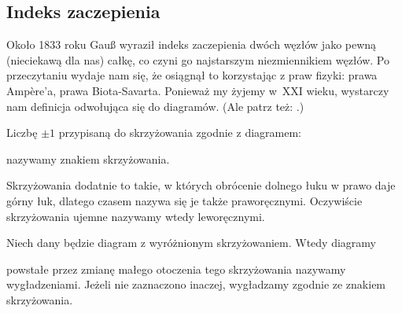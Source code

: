
\subsection{Indeks zaczepienia}
%
Około 1833 roku Gauß wyraził indeks zaczepienia dwóch węzłów jako pewną (nieciekawą dla nas) całkę, co czyni go najstarszym niezmiennikiem węzłów.
%
Po przeczytaniu \cite{colberg2013} wydaje nam się, że osiągnął to korzystając z praw fizyki: prawa Ampère'a, prawa Biota-Savarta.
Ponieważ my żyjemy w~XXI wieku, wystarczy nam definicja odwołująca się do diagramów.
(Ale patrz też: \cite[s. 11]{kawauchi1996}.)

\begin{definition}[znak]
%
    Liczbę $\pm 1$ przypisaną do skrzyżowania zgodnie z diagramem:
\begin{comment}
    \[
        \sign \left( \MediumPlusCrossingArrows \right) = +1 \quad
        \sign \left( \MediumMinusCrossingArrows \right) = -1
    \]
\end{comment}
    nazywamy znakiem skrzyżowania.
\end{definition}

Skrzyżowania dodatnie to takie, w których obrócenie dolnego łuku w prawo daje górny łuk, dlatego czasem nazywa się je także praworęcznymi.
Oczywiście skrzyżowania ujemne nazywamy wtedy leworęcznymi.
%
%

\begin{definition}[wygładzenie]
%
    Niech dany będzie diagram z wyróżnionym skrzyżowaniem.
    Wtedy diagramy
\begin{comment}
    \begin{figure}[H]
        \begin{minipage}[b]{.48\linewidth}
            \[
                \LargeAlphaSmoothing
            \]
            \subcaption{wygładzenie dodatnie}
        \end{minipage}
        \begin{minipage}[b]{.48\linewidth}
            \[
                \LargeBetaSmoothing
            \]
            \subcaption{wygładzenie ujemne}
        \end{minipage}
    \end{figure}
\end{comment}
    powstałe przez zmianę małego otoczenia tego skrzyżowania nazywamy wygładzeniami.
    Jeżeli nie zaznaczono inaczej, wygładzamy zgodnie ze znakiem skrzyżowania.
\end{definition}

